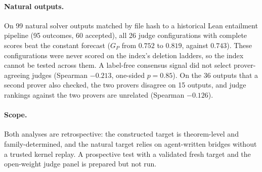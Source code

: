 \paragraph{Natural outputs.}
On 99 natural solver outputs matched by file hash to a historical Lean entailment pipeline (95 outcomes, 60 accepted), all 26 judge configurations with complete scores beat the constant forecast ($G_P$ from $0.752$ to $0.819$, against $0.743$).
These configurations were never scored on the index's deletion ladders, so the index cannot be tested across them.
A label-free consensus signal did not select prover-agreeing judges (Spearman $-0.213$, one-sided $p=0.85$).
On the 36 outputs that a second prover also checked, the two provers disagree on 15 outputs, and judge rankings against the two provers are unrelated (Spearman $-0.126$).

\paragraph{Scope.}
Both analyses are retrospective: the constructed target is theorem-level and family-determined, and the natural target relies on agent-written bridges without a trusted kernel replay.
A prospective test with a validated fresh target and the open-weight judge panel is prepared but not run.
